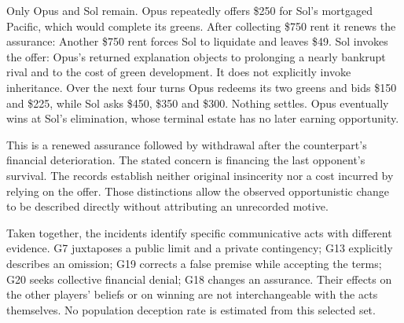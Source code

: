 Only Opus and Sol remain. Opus repeatedly offers \$250 for Sol's mortgaged Pacific, which would complete its greens. After collecting \$750 rent it renews the assurance:
Another \$750 rent forces Sol to liquidate and leaves \$49. Sol invokes the offer:
Opus's returned explanation objects to prolonging a nearly bankrupt rival and to the cost of green development. It does not explicitly invoke inheritance. Over the next four turns Opus redeems its two greens and bids \$150 and \$225, while Sol asks \$450, \$350 and \$300. Nothing settles. Opus eventually wins at Sol's elimination, whose terminal estate has no later earning opportunity.

This is a renewed assurance followed by withdrawal after the counterpart's financial deterioration. The stated concern is financing the last opponent's survival. The records establish neither original insincerity nor a cost incurred by relying on the offer. Those distinctions allow the observed opportunistic change to be described directly without attributing an unrecorded motive.

Taken together, the incidents identify specific communicative acts with different evidence. G7 juxtaposes a public limit and a private contingency; G13 explicitly describes an omission; G19 corrects a false premise while accepting the terms; G20 seeks collective financial denial; G18 changes an assurance. Their effects on the other players' beliefs or on winning are not interchangeable with the acts themselves. No population deception rate is estimated from this selected set.
